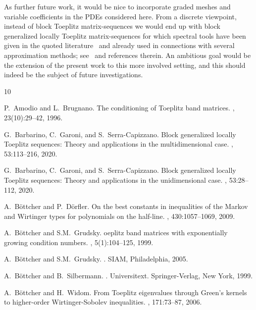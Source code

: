 \documentclass[addpoints,12pt,letter]{article}
\numberwithin{equation}{section}
\theoremstyle{definition}
\begin{document}
As further future work, it would be nice to incorporate graded meshes and variable coefficients in the PDEs considered here.
From a discrete viewpoint, instead of block Toeplitz matrix-sequences we would end up with block generalized locally Toeplitz matrix-sequences for which spectral tools have been given in the quoted literature~\cite{BaGa20b,BaGa20a} and already used in connections with several approximation methods; see~\cite{BaGa20b,BaGa20a,GaMa14,GaSe18a,GaSe15,GaSp19} and references therein.
An ambitious goal would be the extension of the present work to this more involved setting, and this should indeed be the subject of future investigations.

\begin{thebibliography}{10}

P.~Amodio and L.~Brugnano.
\newblock The conditioning of {T}oeplitz band matrices.
, 23(10):29--42, 1996.

G.~Barbarino, C.~Garoni, and S.~Serra-Capizzano.
\newblock Block generalized locally {T}oeplitz sequences: {T}heory and applications in the multidimensional case.
, 53:113--216, 2020.

G.~Barbarino, C.~Garoni, and S.~Serra-Capizzano.
\newblock Block generalized locally {T}oeplitz sequences: {T}heory and applications in the unidimensional case.
, 53:28--112, 2020.

A.~B\"ottcher and P.~D\"orfler.
\newblock On the best constants in inequalities of the Markov and Wirtinger types for polynomials on the half-line.
, 430:1057--1069, 2009.

A.~B\"{o}ttcher and {\relax S.M}.~Grudsky.
oeplitz band matrices with exponentially growing condition numbers.
, 5(1):104--125, 1999.

A.~B\"{o}ttcher and {\relax S.M}.~Grudsky.
.
\newblock SIAM, Philadelphia, 2005.

A.~B\"{o}ttcher and B.~Silbermann.
.
\newblock Universitext. Springer-Verlag, New York, 1999.

A.~B\"{o}ttcher and H.~Widom.
\newblock From Toeplitz eigenvalues through Green's kernels to higher-order Wirtinger-Sobolev inequalities.
, 171:73--87, 2006.


\end{thebibliography}
\end{document}
